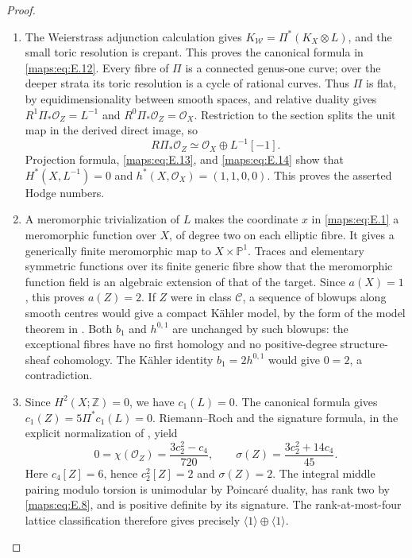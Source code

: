 \documentclass[11pt,a4paper]{article}
\numberwithin{equation}{section}
\theoremstyle{definition}
\begin{document}
\begin{proof}
\begin{enumerate}[label=\arabic*.,leftmargin=*]
\item The Weierstrass adjunction calculation gives
$K_{\mathscr W}=\Pi^*(K_X\otimes L)$, and the small toric
resolution is crepant.  This proves the canonical formula in
\eqref{maps:eq:E.12}.  Every fibre of $\Pi$ is a connected genus-one curve;
over the deeper strata its toric resolution is a cycle of rational
curves.  Thus $\Pi$ is flat, by equidimensionality between smooth
spaces, and relative duality gives
$R^1\Pi_*\mathcal O_Z=L^{-1}$ and
$R^0\Pi_*\mathcal O_Z=\mathcal O_X$.
Restriction to the section splits the unit map in the derived
direct image, so
\[
 R\Pi_*\mathcal O_Z\simeq
 \mathcal O_X\oplus L^{-1}[-1].
\]
Projection formula, \eqref{maps:eq:E.13}, and \eqref{maps:eq:E.14} show that
$H^*(X,L^{-1})=0$ and $h^*(X,\mathcal O_X)=(1,1,0,0)$.
This proves the asserted Hodge numbers.

\item A meromorphic trivialization of $L$ makes the coordinate $x$ in
\eqref{maps:eq:E.1} a meromorphic function over $X$, of degree two on each
elliptic fibre.  It gives a generically finite meromorphic map to
$X\times\mathbb P^1$.  Traces and elementary symmetric functions
over its finite generic fibre show that the meromorphic function
field is an algebraic extension of that of the target.  Since
$a(X)=1$, this proves $a(Z)=2$.  If $Z$ were in class
$\mathcal C$, a sequence of blowups along smooth centres would
give a compact K\"ahler model, by the form of the model theorem
in \cite[Theorem~1.1 and Remark~1.2, p.~2]{ffJiaMeng}.
Both $b_1$ and $h^{0,1}$ are unchanged by such blowups: the
exceptional fibres have no first homology and no positive-degree
structure-sheaf cohomology.  The K\"ahler identity
$b_1=2h^{0,1}$ would give $0=2$, a contradiction.

\item Since $H^2(X;\mathbb Z)=0$, we have $c_1(L)=0$.
The canonical formula gives $c_1(Z)=5\Pi^*c_1(L)=0$.
Riemann--Roch and the signature
formula, in the explicit normalization of
\cite[(1.2)--(1.4), pp.~3--4]{ffEsoleKang}, yield
\[
 0=\chi(\mathcal O_Z)=\frac{3c_2^2-c_4}{720},\qquad
 \sigma(Z)=\frac{3c_2^2+14c_4}{45}.
\]
Here $c_4[Z]=6$, hence $c_2^2[Z]=2$ and $\sigma(Z)=2$.
The integral middle pairing modulo torsion is unimodular by
Poincar\'e duality, has rank two by \eqref{maps:eq:E.8}, and is positive definite
by its signature.  The rank-at-most-four lattice classification
\cite[Theorem~2.2.1, p.~61]{ffPetersSterk} therefore gives precisely
$\langle1\rangle\oplus\langle1\rangle$.
\end{enumerate}
\end{proof}
\end{document}
